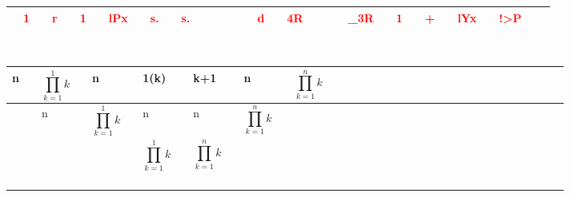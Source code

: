 \documentclass[a4paper]{article}
\begin{document}
\newcommand{\rb}[1]{\textcolor{red}{\textbf{#1}}}
\newcommand{\bb}[1]{\textcolor{blue}{\textbf{#1}}}



\noindent
\begin{tabular}{|p{0.15cm}|p{0.10cm} p{0.10cm}|p{0.10cm} p{0.10cm}|p{0.10cm} p{0.10cm}|p{0.10cm} p{0.10cm}|p{0.10cm} p{0.10cm}|p{0.10cm} p{0.10cm}||p{0.10cm} p{0.10cm}|p{0.10cm} p{0.10cm}||p{0.10cm} p{0.10cm}|p{0.10cm} p{0.10cm}|p{0.10cm} p{0.10cm}|p{0.10cm} p{0.10cm}|p{0.10cm} p{0.10cm}|p{0.10cm} p{0.10cm}|p{0.10cm} p{0.10cm}|p{0.10cm} p{0.10cm}|p{0.05cm}|}
\hline
\cellcolor{mygray} & \rb{1} & & \rb{r}  & &  \rb{1} & & \rb{lPx}  & & \rb{s.}  & & \rb{s.}  & & \cellcolor{mygray}  & \cellcolor{mygray} & \cellcolor{mygray}& \cellcolor{mygray}  &  \rb{d} & & \rb{4R}  & & \rb{\text{*}}  & & \rb{\_3R}  & & \rb{1}  & & \rb{+}  & & \rb{lYx}  & & \rb{!\textgreater{}P}   & &   \cellcolor{mygray} \\
\hline
\end{tabular} \\
\begin{tabular}{|m{0.10cm} m{0.10cm}|m{0.10cm} m{0.10cm}|m{0.10cm} m{0.10cm}|m{0.10cm} m{0.10cm}|m{0.10cm} m{0.10cm}|m{0.10cm} m{0.10cm}|m{0.10cm} m{0.10cm}||m{0.10cm} m{0.10cm}||m{0.10cm} m{0.10cm}|m{0.10cm} m{0.10cm}|m{0.10cm} m{0.10cm}|m{0.10cm} m{0.10cm}|m{0.10cm} m{0.10cm}|m{0.10cm} m{0.10cm}|m{0.10cm} m{0.10cm}|m{0.10cm} m{0.10cm}|m{0.10cm} m{0.10cm}|}
n & & \[ \prod_{k=1}^{1}k \]  & & n  & & 1(k)  & & k+1  & & n  & & \[ \prod_{k=1}^{n}k \]  & & \cellcolor{mygray}  & \cellcolor{mygray} &   & &   & &   & &   & &   & &   & &   & &   & &   & \\
 \hline
 & & n  & & \[ \prod_{k=1}^{1}k \]   & & n  & & n  & & \[ \prod_{k=1}^{n}k \]   & &   & & \cellcolor{mygray}  & \cellcolor{mygray} &   & &   & &   & &   & &   & &   & &   & &   & &   & \\
 \hline
 & &   & &   & & \[ \prod_{k=1}^{1}k \]    & & \[ \prod_{k=1}^{n}k \]   & &   & &   & & \cellcolor{mygray}  & \cellcolor{mygray} &   & &   & &   & &   & &   & &   & &   & &   & &   & \\
 \hline
 & &   & &   & &   & &   & &   & &   & & \cellcolor{mygray}  & \cellcolor{mygray} &   & &   & &   & &   & &   & &   & &   & &   & &   & \\
 \hline
 & &   & &   & &   & &   & &   & &   & & \cellcolor{mygray}  & \cellcolor{mygray} &   & &   & &   & &   & &   & &   & &   & &   & &   & \\
 \hline
 & &   & &   & &   & &   & &   & &   & & \cellcolor{mygray}  & \cellcolor{mygray} &   & &   & &   & &   & &   & &   & &   & &   & &   & \\
 \hline
 & &   & &   & &   & &   & &   & &   & & \cellcolor{mygray}  & \cellcolor{mygray} &   & &   & &   & &   & &   & &   & &   & &   & &   & \\
\hline

\end{tabular}
\end{document}
